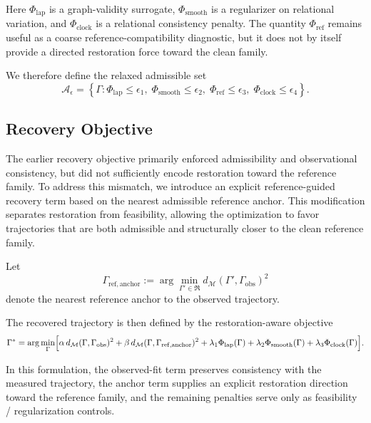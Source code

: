 \documentclass[11pt,a4paper]{article}
\theoremstyle{definition}
\theoremstyle{remark}
\begin{document}
Here $\Phi_{\mathrm{lap}}$ is a graph-validity surrogate, $\Phi_{\mathrm{smooth}}$ is a regularizer on relational variation, and $\Phi_{\mathrm{clock}}$ is a relational consistency penalty.  The quantity $\Phi_{\mathrm{ref}}$ remains useful as a coarse reference-compatibility diagnostic, but it does not by itself provide a directed restoration force toward the clean family.

We therefore define the relaxed admissible set
\begin{equation}
\mathcal{A}_\epsilon
=
\left\{
\Gamma :
\Phi_{\mathrm{lap}} \le \epsilon_1,\;
\Phi_{\mathrm{smooth}} \le \epsilon_2,\;
\Phi_{\mathrm{ref}} \le \epsilon_3,\;
\Phi_{\mathrm{clock}} \le \epsilon_4
\right\}.
\end{equation}

\subsection{Recovery Objective}

The earlier recovery objective primarily enforced admissibility and observational consistency, but did not sufficiently encode restoration toward the reference family. To address this mismatch, we introduce an explicit reference-guided recovery term based on the nearest admissible reference anchor. This modification separates restoration from feasibility, allowing the optimization to favor trajectories that are both admissible and structurally closer to the clean reference family.

Let
\begin{equation}
\Gamma_{\mathrm{ref,anchor}}
:=
\arg\min_{\Gamma' \in \mathfrak R}
d_{\mathcal M}(\Gamma',\Gamma_{\mathrm{obs}})^2
\end{equation}
denote the nearest reference anchor to the observed trajectory.

The recovered trajectory is then defined by the restoration-aware objective
\begin{equation}
\Gamma^*
=
\arg\min_{\Gamma}
\Bigl[
\alpha\, d_{\mathcal M}(\Gamma,\Gamma_{\mathrm{obs}})^2
+
\beta\, d_{\mathcal M}(\Gamma,\Gamma_{\mathrm{ref,anchor}})^2
+
\lambda_1 \Phi_{\mathrm{lap}}(\Gamma)
+
\lambda_2 \Phi_{\mathrm{smooth}}(\Gamma)
+
\lambda_3 \Phi_{\mathrm{clock}}(\Gamma)
\Bigr].
\end{equation}

In this formulation, the observed-fit term preserves consistency with the measured trajectory, the anchor term supplies an explicit restoration direction toward the reference family, and the remaining penalties serve only as feasibility / regularization controls.
\end{document}

